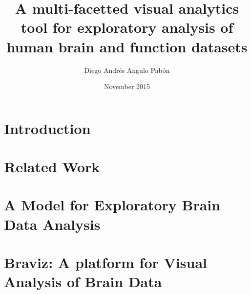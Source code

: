 \documentclass[12pt]{report}
\begin{document}
\title{
	{A multi-facetted visual analytics tool for exploratory analysis of human brain and function datasets}\\
}
\author{Diego Andrés Angulo Pabón}
\date{November 2015}





%
%
%

\tableofcontents

\chapter{Introduction}
\label{chap_intro}


\chapter{Related Work}
\label{chap_related}


\chapter{A Model for Exploratory Brain Data Analysis}
\label{chap_model}


\chapter{Braviz: A platform for Visual Analysis of Brain Data}
\label{chap_braviz}

\end{document}
